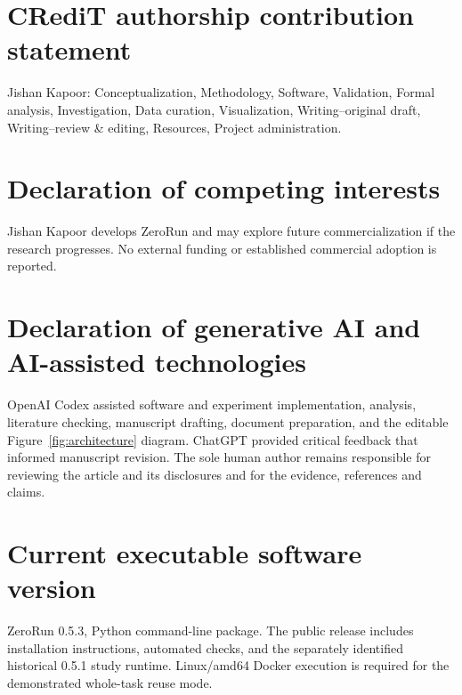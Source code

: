 \documentclass[preprint,12pt,a4paper]{elsarticle}
\begin{document}
\section*{CRediT authorship contribution statement}
Jishan Kapoor: Conceptualization, Methodology, Software, Validation, Formal analysis, Investigation, Data curation, Visualization, Writing--original draft, Writing--review \& editing, Resources, Project administration.

\section*{Declaration of competing interests}
Jishan Kapoor develops ZeroRun and may explore future commercialization if the research progresses. No external funding or established commercial adoption is reported.

\section*{Declaration of generative AI and AI-assisted technologies}
OpenAI Codex assisted software and experiment implementation, analysis, literature checking, manuscript drafting, document preparation, and the editable Figure~\ref{fig:architecture} diagram. ChatGPT provided critical feedback that informed manuscript revision. The sole human author remains responsible for reviewing the article and its disclosures and for the evidence, references and claims.

\begingroup
\footnotesize


\endgroup
\section*{Current executable software version}
ZeroRun 0.5.3, Python command-line package. The public release includes installation instructions, automated checks, and the separately identified historical 0.5.1 study runtime. Linux/amd64 Docker execution is required for the demonstrated whole-task reuse mode.
\end{document}
